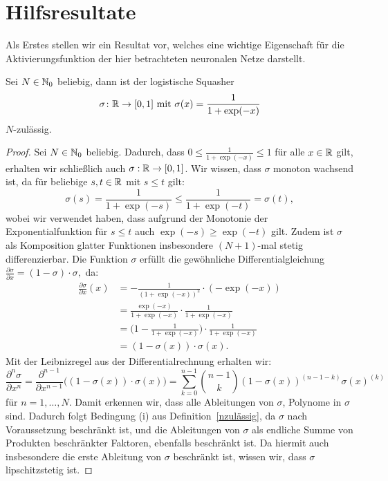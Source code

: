 \section{Hilfsresultate}
Als Erstes stellen wir ein Resultat vor, welches eine wichtige Eigenschaft für die Aktivierungsfunktion der hier betrachteten neuronalen Netze darstellt.
\begin{lem}
\label{lem:logsquasher}
Sei $N \in \mathbb{N}_0$ beliebig, dann ist der logistische Squasher $$\sigma\colon \mathbb{R} \to [0, 1] \text{ mit } \sigma(x) = \frac{1}{1 + \exp(-x)}$$ $N$-zulässig.
\end{lem}
\begin{proof}
Sei $N \in \mathbb{N}_0$ beliebig. Dadurch, dass $0 \leq \frac{1}{1 + \exp(-x)} \leq 1$ für alle $x \in \mathbb{R}$ gilt, erhalten wir schließlich auch $\sigma: \mathbb{R} \to [0,1]$. Wir wissen, dass $\sigma$ monoton wachsend ist, da für beliebige $s, t \in \mathbb{R}$ mit $s \leq t$ gilt:
$$\sigma(s) = \frac{1}{1 + \exp(-s)} \leq \frac{1}{1 + \exp(-t)} = \sigma(t),$$
wobei wir verwendet haben, dass aufgrund der Monotonie der Exponentialfunktion für $s \leq t$ auch $\exp(-s) \geq \exp(-t)$ gilt.
Zudem ist $\sigma$ als Komposition glatter Funktionen insbesondere $(N + 1)$-mal stetig differenzierbar. Die Funktion $\sigma$ erfüllt die gewöhnliche Differentialgleichung $\frac{\partial\sigma}{\partial x} = (1 - \sigma) \cdot \sigma,$ da:
\begin{equation*}
\begin{split}
\frac{\partial \sigma}{\partial x}(x) &= -\frac{1}{(1 + \exp(-x))^2} \cdot (-\exp(-x)) \\
& = \frac{\exp(-x)}{1 + \exp(-x)} \cdot \frac{1}{1 + \exp(-x)} \\
& = \bigg(1 - \frac{1}{1 + \exp(-x)}\bigg) \cdot \frac{1}{1 + \exp(-x)} \\
& = (1 - \sigma(x)) \cdot \sigma(x).
\end{split}
\end{equation*}
Mit der Leibnizregel aus der Differentialrechnung erhalten wir:
\begin{equation}
\label{eq:leibniz}
\frac{\partial^n\sigma}{\partial x^n} = \frac{\partial^{n - 1}}{\partial x^{n - 1}}\bigg((1 - \sigma(x)) \cdot \sigma(x)\bigg) = \sum_{k = 0}^{n-1}\binom{n - 1}{k}(1 - \sigma(x))^{(n - 1 - k)}  \sigma(x)^{(k)} 
\end{equation}
für $n = 1,\dots,N$. 
Damit erkennen wir, dass alle Ableitungen von $\sigma$, Polynome in $\sigma$ sind. Dadurch folgt Bedingung (i) aus Definition~\ref{nzulässig}, da $\sigma$ nach Voraussetzung beschränkt ist, und die Ableitungen von $\sigma$ als endliche Summe von Produkten beschränkter Faktoren, ebenfalls beschränkt ist. Da hiermit auch insbesondere die erste Ableitung von $\sigma$ beschränkt ist, wissen wir, dass $\sigma$ lipschitzstetig ist.


\end{proof}
